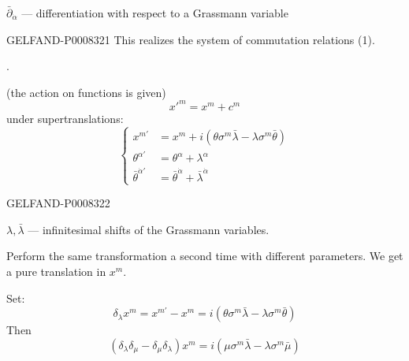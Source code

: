 \(\bar\partial_{\dot\alpha}\) — differentiation with respect to a Grassmann variable


\begin{GelfandAdjacentEvidence}{GELFAND-P000832}{1}
This realizes the system of commutation relations (1).

.

(the action on functions is given)
\[
{x'}^m=x^m+c^m
\]
under supertranslations:
\begin{equation*}
\left\{\begin{aligned}
x^{m'}&=x^m+i(\theta\sigma^m\bar\lambda-\lambda\sigma^m\bar\theta)\\
\theta^{\alpha'}&=\theta^\alpha+\lambda^\alpha\\
\bar\theta^{\dot\alpha'}&=\bar\theta^{\dot\alpha}+\bar\lambda^{\dot\alpha}
\end{aligned}\right.
\tag{6}
\end{equation*}
\end{GelfandAdjacentEvidence}
\begin{GelfandAdjacentEvidence}{GELFAND-P000832}{2}

\(\lambda,\bar\lambda\) — infinitesimal shifts of the Grassmann variables.

Perform the same transformation a second time with different parameters. We get a pure translation in \(x^m\).

Set:
\[
\delta_\lambda x^m=x^{m'}-x^m
=i(\theta\sigma^m\bar\lambda-\lambda\sigma^m\bar\theta)
\]
Then
\begin{equation*}
(\delta_\lambda\delta_\mu-\delta_\mu\delta_\lambda)x^m
=i(\mu\sigma^m\bar\lambda-\lambda\sigma^m\bar\mu)
\tag{7}
\end{equation*}
\end{GelfandAdjacentEvidence}
